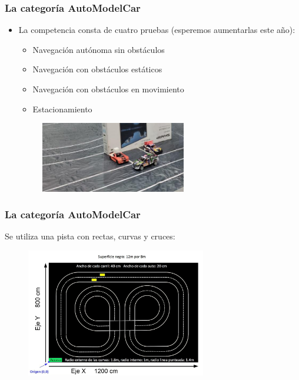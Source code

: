 \begin{frame}\frametitle{La categoría AutoModelCar}
  \begin{itemize}
  \item La competencia consta de cuatro pruebas (esperemos aumentarlas este año):
    \begin{multicols}{2}
      \begin{itemize}
      \item Navegación autónoma sin obstáculos
      \item Navegación con obstáculos estáticos
      \item Navegación con obstáculos en movimiento
      \item Estacionamiento
      \end{itemize}
    \end{multicols}
    \begin{figure}
      \centering
      \includegraphics[width=0.6\textwidth]{Figuras/AutoModelCarEstacionamiento.jpg}
    \end{figure}
  \end{itemize}
\end{frame}

\begin{frame}\frametitle{La categoría AutoModelCar}
  Se utiliza una pista con rectas, curvas y cruces:
  \begin{figure}
    \centering
    \includegraphics[width=0.7\textwidth]{Figuras/AutoModelCarPista.png}
  \end{figure}
\end{frame}

